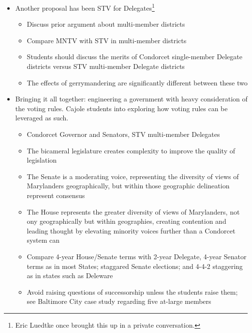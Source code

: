 \begin{itemize}
\begin{itemize}
        \item Another proposal has been STV for Delegates\footnote{Eric Luedtke once brought this up in a private conversation.}
        \begin{itemize}
            \item Discuss prior argument about multi-member districts

            \item Compare MNTV with STV in multi-member districts

            \item Students should discuss the merits of Condorcet single-member Delegate districts versus STV multi-member Delegate districts

            \item The effects of gerrymandering are significantly different between these two
        \end{itemize}

        \item Bringing it all together:  engineering a government with heavy consideration of the voting rules.  Cajole students into exploring how voting rules can be leveraged as such.
        \begin{itemize}
            \item Condorcet Governor and Senators, STV multi-member Delegates

            \item The bicameral legislature creates complexity to improve the quality of legislation

            \item The Senate is a moderating voice, representing the diversity of views of Marylanders geographically, but within those geographic delineation represent consensus

            \item The House represents the greater diversity of views of Marylanders, not ony geographically but within geographies, creating contention and leading thought by elevating minority voices further than a Condorcet system can

            \item Compare 4-year House/Senate terms with 2-year Delegate, 4-year Senator terms as in most States; staggared Senate elections; and 4-4-2 staggering as in states such as Deleware

            \item Avoid raising questions of successorship unless the students raise them; see Baltimore City case study regarding five at-large members
        \end{itemize}
    \end{itemize}


\end{itemize}

